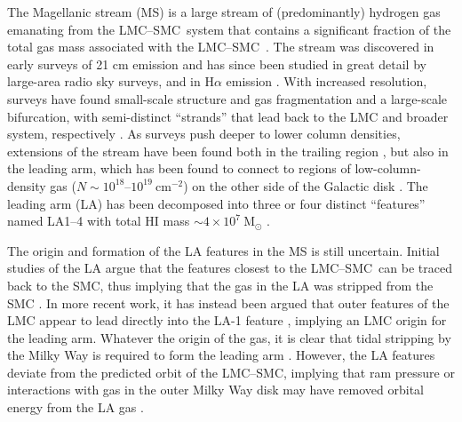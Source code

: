 \documentclass[modern]{aastex62}
\newcommand{\msun}{\textrm{M}_\odot}
\newcommand{\lmcsmc}{LMC--SMC}
\begin{document}
The Magellanic stream (MS) is a large stream of (predominantly) hydrogen gas emanating from the \lmcsmc\ system that contains a significant fraction of the total gas mass associated with the \lmcsmc\ \citep{Bruns:2005}.
The stream was discovered in early surveys of 21 cm emission and has since been studied in great detail by large-area radio sky surveys, and in H$\alpha$ emission \citep{Weiner:1996, Barger:2017}.
With increased resolution, surveys have found small-scale structure and gas fragmentation \citep[e.g.,][]{Nidever:2008, For:2014} and a large-scale bifurcation, with semi-distinct ``strands'' that lead back to the LMC and broader system, respectively \citep[e.g.,][]{Morras:1983, Putman:2003}.
As surveys push deeper to lower column densities, extensions of the stream have been found both in the trailing region \citep{Nidever:2010}, but also in the leading arm, which has been found to connect to regions of low-column-density gas ($N\sim 10^{18}$--$10^{19}~\textrm{cm}^{-2}$) on the other side of the Galactic disk \citep{Putman:1998, Nidever:2008}.
The leading arm (LA) has been decomposed into three or four distinct ``features'' named LA1--4 \citep{Bruns:2005, Nidever:2008, Venzmer:2012} with total HI mass $\sim 4 \times10^7~\msun$ \citep{Venzmer:2012}.

The origin and formation of the LA features in the MS is still uncertain.
Initial studies of the LA argue that the features closest to the \lmcsmc\ can be traced back to the SMC, thus implying that the gas in the LA was stripped from the SMC \citep{Putman:1998}.
In more recent work, it has instead been argued that outer features of the LMC appear to lead directly into the LA-1 feature \citep{Nidever:2008}, implying an LMC origin for the leading arm.
Whatever the origin of the gas, it is clear that tidal stripping by the Milky Way is required to form the leading arm \citep{Nidever:2008}.
However, the LA features deviate from the predicted orbit of the \lmcsmc, implying that ram pressure or interactions with gas in the outer Milky Way disk may have removed orbital energy from the LA gas \citep[e.g.,][]{Bekki:2008}.
\end{document}
